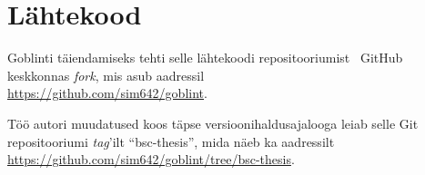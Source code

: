 \documentclass[../thesis.tex]{subfiles}
\begin{document}
\section{Lähtekood}
\label{app:lahtekood}

Goblinti täiendamiseks tehti selle lähtekoodi repositooriumist~\cite{goblint_repo} GitHub keskkonnas \textit{fork}, mis asub aadressil \\
\indent \url{https://github.com/sim642/goblint}.

\noindent Töö autori muudatused koos täpse versioonihaldusajalooga leiab selle Git repositooriumi \textit{tag}'ilt \enquote{bsc-thesis}, mida näeb ka aadressilt \\
\indent \url{https://github.com/sim642/goblint/tree/bsc-thesis}.
\end{document}
